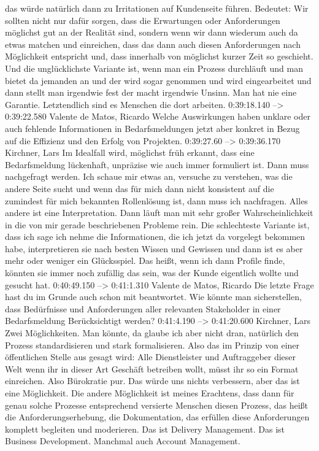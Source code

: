 das würde natürlich dann zu Irritationen auf Kundenseite führen. Bedeutet: Wir sollten nicht nur dafür sorgen, dass die Erwartungen oder Anforderungen möglichst gut an der Realität sind, sondern wenn wir dann wiederum auch da etwas matchen und einreichen, dass das dann auch diesen Anforderungen nach Möglichkeit entspricht und, dass innerhalb von möglichst kurzer Zeit so geschieht. Und die unglücklichste Variante ist, wenn man ein Prozess durchläuft und man bietet da jemanden an und der wird sogar genommen und wird eingearbeitet und dann stellt man irgendwie fest der macht irgendwie Unsinn. Man hat nie eine Garantie. Letztendlich sind es Menschen die dort arbeiten.
0:39:18.140 --> 0:39:22.580
Valente de Matos, Ricardo
Welche Auswirkungen haben unklare oder auch fehlende Informationen in Bedarfsmeldungen jetzt aber konkret in Bezug auf die Effizienz und den Erfolg von Projekten.
0:39:27.60 --> 0:39:36.170
Kirchner, Lars
Im Idealfall wird, möglichst früh erkannt, dass eine Bedarfsmeldung lückenhaft, unpräzise wie auch immer formuliert ist. Dann muss nachgefragt werden. Ich schaue mir etwas an, versuche zu verstehen, was die andere Seite sucht und wenn das für mich dann nicht konsistent auf die zumindest für mich bekannten Rollenlösung ist, dann muss ich nachfragen. Alles andere ist eine Interpretation. Dann läuft man mit sehr großer Wahrscheinlichkeit in die von mir gerade beschriebenen Probleme rein. Die schlechteste Variante ist, dass ich sage ich nehme die Informationen, die ich jetzt da vorgelegt bekommen habe, interpretieren sie nach besten Wissen und Gewissen und dann ist es aber mehr oder weniger ein Glücksspiel. Das heißt, wenn ich dann Profile finde, könnten sie immer noch zufällig das sein, was der Kunde eigentlich wollte und gesucht hat.
0:40:49.150 --> 0:41:1.310
Valente de Matos, Ricardo
Die letzte Frage hast du im Grunde auch schon mit beantwortet. Wie könnte man sicherstellen, dass Bedürfnisse und Anforderungen aller relevanten Stakeholder in einer Bedarfsmeldung Berücksichtigt werden?
0:41:4.190 --> 0:41:20.600
Kirchner, Lars
Zwei Möglichkeiten. Man könnte, da glaube ich aber nicht dran, natürlich den Prozess standardisieren und stark formalisieren. Also das im Prinzip von einer öffentlichen Stelle aus gesagt wird: Alle Dienstleister und Auftraggeber dieser Welt wenn ihr in dieser Art Geschäft betreiben wollt, müsst ihr so ein Format einreichen. Also Bürokratie pur. Das würde uns nichts verbessern, aber das ist eine Möglichkeit. Die andere Möglichkeit ist meines Erachtens, dass dann für genau solche Prozesse entsprechend versierte Menschen diesen Prozess, das heißt die Anforderungserhebung, die Dokumentation, das erfüllen diese Anforderungen komplett begleiten und moderieren. Das ist Delivery Management. Das ist Business Development. Manchmal auch Account Management.
